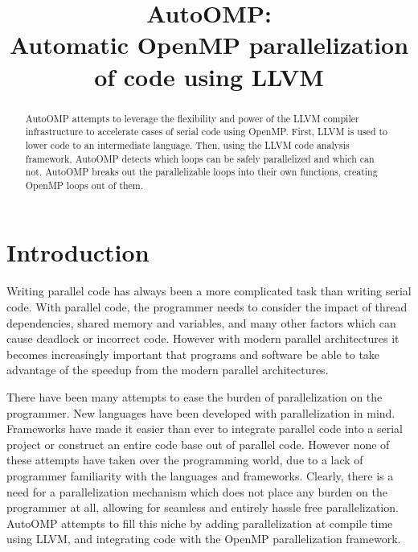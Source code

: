 \documentclass[conference]{IEEEtran}
\begin{document}
\title{AutoOMP:\\Automatic OpenMP parallelization of code using LLVM}

\author{
\and
{}
}

\maketitle

\begin{abstract}
   AutoOMP attempts to leverage the flexibility and power of the LLVM
   compiler infrastructure to accelerate cases of serial code using
   OpenMP. First, LLVM is used to lower code to an intermediate
   language. Then, using the LLVM code analysis framework, AutoOMP
   detects which loops can be safely parallelized and which can
   not. AutoOMP breaks out the parallelizable loops into their own
   functions, creating OpenMP loops out of them.
\end{abstract}

\IEEEpeerreviewmaketitle

\section{Introduction}
Writing parallel code has always been a more complicated task than
writing serial code. With parallel code, the programmer needs to
consider the impact of thread dependencies, shared memory and
variables, and many other factors which can cause deadlock or
incorrect code. However with modern parallel architectures it becomes
increasingly important that programs and software be able to take
advantage of the speedup from the modern parallel
architectures.

There have been many attempts to ease the burden of parallelization on
the programmer. New languages have been developed with parallelization
in mind. Frameworks have made it easier than ever to integrate
parallel code into a serial project or construct an entire code base
out of parallel code. However none of these attempts have taken over
the programming world, due to a lack of programmer familiarity with
the languages and frameworks. Clearly, there is a need for a
parallelization mechanism which does not place any burden on the
programmer at all, allowing for seamless and entirely hassle free
parallelization. AutoOMP attempts to fill this niche by adding
parallelization at compile time using LLVM, and integrating code with
the OpenMP parallelization framework.
\end{document}
